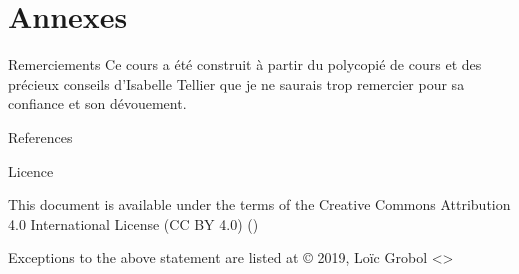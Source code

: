 \documentclass[hyperref={unicode}, xcolor={svgnames}, french]{beamer}
\begin{document}

\appendix
{}  %
\section{Annexes}
\begin{frame}{Remerciements}
    Ce cours a été construit à partir du polycopié de cours  \parencite{tellier2017fouille} et des précieux conseils d'Isabelle Tellier que je ne saurais trop remercier pour sa confiance et son dévouement.
\end{frame}

\begin{frame}[allowframebreaks]{References}
    \printbibliography[heading=none]
\end{frame}

\begin{frame}{Licence}
    \begin{center}
        {\huge \ccby}
        \vfill
        This document is available under the terms of the Creative Commons Attribution 4.0 International License (CC BY 4.0) ()

        Exceptions to the above statement are listed at {\small{}}
        \vfill
        © 2019, Loïc Grobol <>

    \end{center}
\end{frame}
\end{document}
